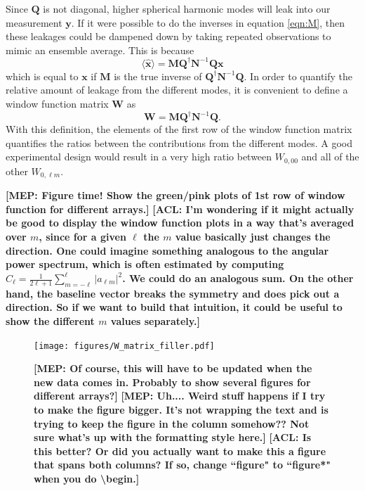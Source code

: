 \documentclass[twolcolumn,apj]{emulateapj}
\newcommand{\x}{\mathbf{x}}
\newcommand{\xhat}{\hat{\mathbf{x}}}
\newcommand{\y}{\mathbf{y}}
\newcommand{\N}{\mathbf{N}}
\newcommand{\Q}{\mathbf{Q}}
\newcommand{\M}{\mathbf{M}}
\newcommand{\W}{\mathbf{W}}
\newcommand{\acl}[1]{{\color{red} \textbf{[ACL:  #1]}}}
\newcommand{\mep}[1]{{\color{applegreen} \textbf{[MEP:  #1]}}}
\begin{document}
Since $\Q$ is not diagonal, higher spherical harmonic modes will leak into our measurement $\y$. If it were possible to do the inverses in equation \ref{eqn:M}, then these leakages could be dampened down by taking repeated observations to mimic an ensemble average. This is because 
\begin{equation}
\langle \xhat \rangle = \M \Q^\dagger \N^{-1} \Q \x
\end{equation}
which is equal to $\x$ if $\M$ is the true inverse of $\Q^\dagger \N^{-1} \Q$. In order to quantify the relative amount of leakage from the different modes, it is convenient to define a window function matrix $\W$ as 
\begin{equation}
\W = \M \Q^\dagger \N^{-1} \Q. 
\end{equation}
With this definition, the elements of the first row of the window function matrix quantifies the ratios between the contributions from the different modes. A good experimental design would result in a very high ratio between $W_{0,00}$ and all of the other $W_{0,\ell m}$.

\mep{Figure time! Show the green/pink plots of 1st row of window function for different arrays.}
\acl{I'm wondering if it might actually be good to display the window function plots in a way that's averaged over $m$, since for a given $\ell$ the $m$ value basically just changes the direction.  One could imagine something analogous to the angular power spectrum, which is often estimated by computing $\hat{C}_\ell = \frac{1}{2\ell + 1} \sum_{m=-\ell}^{\ell} |a_{\ell m}|^2$.  We could do an analogous sum.  On the other hand, the baseline vector breaks the symmetry and does pick out a direction.  So if we want to build that intuition, it could be useful to show the different $m$ values separately.}

\begin{figure}[h]
	\centering
	\texttt{[image: figures/W\_matrix\_filler.pdf]}
	\caption{\mep{Of course, this will have to be updated when the new data comes in. Probably to show several figures for different arrays?}\mep{Uh.... Weird stuff happens if I try to make the figure bigger. It's not wrapping the text and is trying to keep the figure in the column somehow?? Not sure what's up with the formatting style here.}\acl{Is this better? Or did you actually want to make this a figure that spans both columns? If so, change ``figure" to ``figure*" when you do \textbackslash begin.}}
	\label{fig:WindowFunction}
\end{figure}
\end{document}
